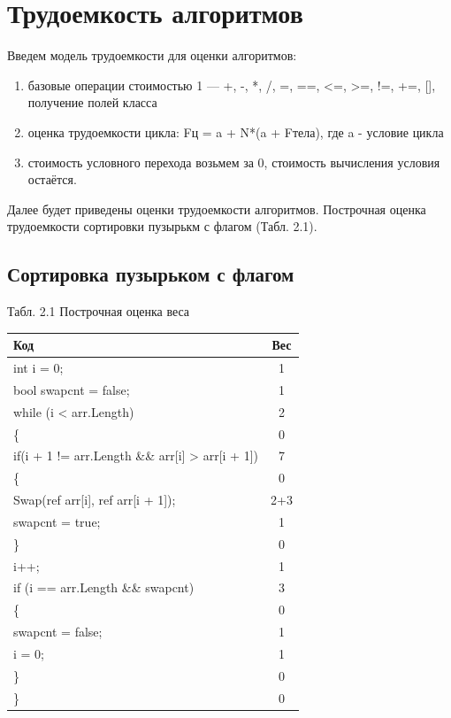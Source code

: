 \documentclass[12pt]{report}
\begin{document}
\section{Трудоемкость алгоритмов}
Введем модель трудоемкости для оценки алгоритмов:
\begin{enumerate}
  	\item  базовые операции стоимостью 1 — +, -, *, /, =, ==, <=, >=, !=, +=, [], получение полей класса
	\item оценка трудоемкости цикла: Fц = a + N*(a + Fтела), где a - условие цикла
	\item стоимость условного перехода возьмем за 0, стоимость вычисления условия остаётся.
\end{enumerate}

Далее будет приведены оценки трудоемкости алгоритмов. Построчная оценка трудоемкости сортировки пузырькм с флагом (Табл. 2.1).

\subsection{Сортировка пузырьком с флагом}
\begin{center}
Табл. 2.1 Построчная оценка веса
	\begin{tabular}{|l c|} 
 	\hline
	Код & Вес \\ [0.5ex] 
 	\hline\hline
 	 int i = 0; & 1\\
 	\hline
	bool swapcnt = false; & 1\\
	\hline
	while (i < arr.Length) & 2\\
	\hline
	\{ & 0\\
	\hline
	if(i + 1 != arr.Length \&\& arr[i] > arr[i + 1]) & 7\\
	\hline
	\{ & 0\\
	\hline
	Swap(ref arr[i], ref arr[i + 1]); & 2+3\\
	\hline
	swapcnt = true; & 1\\
	\hline
	\} & 0\\
	\hline
	i++; & 1\\
	\hline
	if (i == arr.Length \&\& swapcnt) & 3\\
	\hline
	\{ & 0\\
	\hline
	swapcnt = false; & 1\\
	\hline
	i = 0; & 1\\
	\hline
	\} & 0\\
	\hline
	\} & 0\\
	\hline
	\end{tabular}
\end{center}
\end{document}
